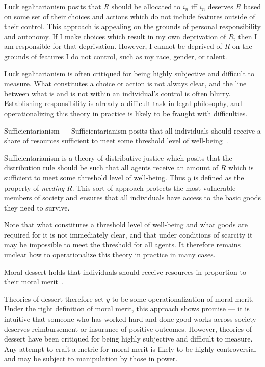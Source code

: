 Luck egalitarianism posits that $R$ should be allocated to $i_n$ iff $i_n$
deserves $R$ based on some set of their choices and actions which do not include
features outside of their control. This approach is appealing on the grounds of
personal responsibility and autonomy. If I make choices which result in my own
deprivation of $R$, then I am responsible for that deprivation. However, I
cannot be deprived of $R$ on the grounds of features I do not control, such as
my race, gender, or talent.

Luck egalitarianism is often critiqued for being highly subjective and difficult
to measure. What constitutes a choice or action is not always clear, and the
line between what is and is not within an individual's control is often blurry.
Establishing responsibility is already a difficult task in legal philosophy, and
operationalizing this theory in practice is likely to be fraught with
difficulties.

\begin{definition}
    Sufficientarianism — Sufficientarianism posits that all individuals should
    receive a share of resources sufficient to meet some threshold level of
    well-being~\cite{Sen_1979}.
\end{definition}

Sufficientarianism is a theory of distributive justice which posits that the
distribution rule should be such that all agents receive an amount of $R$ which
is sufficient to meet some threshold level of well-being. Thus $y$ is defined as
the property of \textit{needing} $R$. This sort of approach protects the most
vulnerable members of society and ensures that all individuals have access to
the basic goods they need to survive.

Note that what constitutes a threshold level of well-being and what goods are
required for it is not immediately clear, and that under conditions of scarcity
it may be impossible to meet the threshold for all agents. It therefore remains
unclear how to operationalize this theory in practice in many cases.

\begin{definition}
    Moral dessert holds that individuals should receive resources in proportion
    to their moral merit~\cite{Pojman_1997}.
\end{definition}

Theories of dessert therefore set $y$ to be some operationalization of moral
merit. Under the right definition of moral merit, this approach shows promise — 
it is intuitive that someone who has worked hard and done good works across
society deserves reimbursement or insurance of positive outcomes. However,
theories of dessert have been critiqued for being highly subjective and
difficult to measure. Any attempt to craft a metric for moral merit is likely to
be highly controversial and may be subject to manipulation by those in power. 

